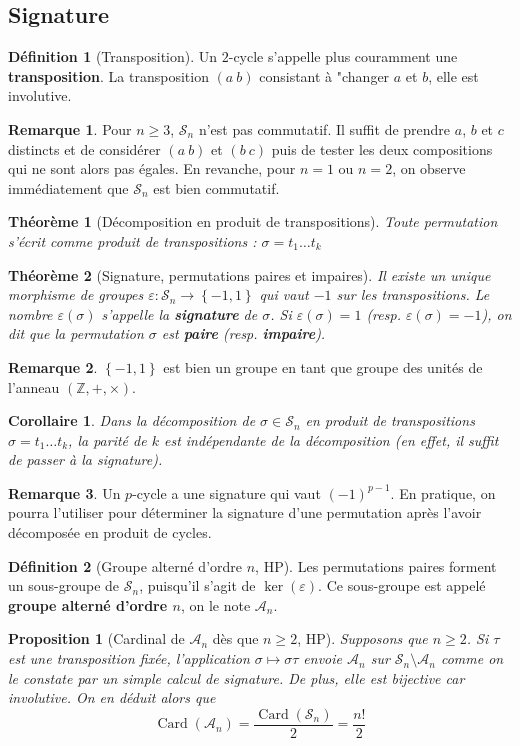 \documentclass[french]{book}
\newcommand{\Z}{\mathbb{Z}}
\theoremstyle{plain}
\newtheorem{thm}{Théorème}[chapter]
\newtheorem{prop}{Proposition}[chapter]
\newtheorem{cor}{Corollaire}[chapter]
\theoremstyle{definition}
\newtheorem{dfn}{Définition}[chapter]
\newtheorem{rmq}{Remarque}[chapter]
\theoremstyle{remark}
\DeclareMathOperator{\card}{Card}
\begin{document}
\subsection{Signature}
\begin{dfn}[Transposition]
	Un $2$-cycle s'appelle plus couramment une \textbf{transposition}. La transposition $(a\ b)$ consistant à "changer $a$ et $b$, elle est involutive.
\end{dfn}
\begin{rmq} Pour $n\geqslant 3$, $\mathcal{S}_n$ n'est pas commutatif. Il suffit de prendre $a$, $b$ et $c$ distincts et de considérer $(a\ b)$ et $(b\ c)$ puis de tester les deux compositions qui ne sont alors pas égales. En revanche, pour $n=1$ ou $n=2$, on observe immédiatement que $\mathcal{S}_n$ est bien commutatif. \end{rmq}
\begin{thm}[Décomposition en produit de transpositions]
	Toute permutation s'écrit comme produit de transpositions : $\sigma=t_1\ldots t_k$
\end{thm}
\begin{thm}[Signature, permutations paires et impaires]
	Il existe un unique morphisme de groupes $\varepsilon:\mathcal{S}_n\rightarrow\left\{-1,1\right\}$ qui vaut $-1$ sur les transpositions. Le nombre $\varepsilon(\sigma)$ s'appelle la \textbf{signature} de $\sigma$. Si $\varepsilon(\sigma)=1$ (resp. $\varepsilon(\sigma)=-1$), on dit que la permutation $\sigma$ est \textbf{paire} (resp. \textbf{impaire}).
\end{thm}
\begin{rmq} $\left\{-1,1\right\}$ est bien un groupe en tant que groupe des unités de l'anneau $(\Z,+,\times)$. \end{rmq}
\begin{cor}
	Dans la décomposition de $\sigma\in\mathcal{S}_n$ en produit de transpositions $\sigma=t_1\ldots t_k$, la parité de $k$ est indépendante de la décomposition (en effet, il suffit de passer à la signature).
\end{cor}
\begin{rmq} Un $p$-cycle a une signature qui vaut $(-1)^{p-1}$. En pratique, on pourra l'utiliser pour déterminer la signature d'une permutation après l'avoir décomposée en produit de cycles. \end{rmq}
\begin{dfn}[Groupe alterné d'ordre $n$, HP]
	Les permutations paires forment un sous-groupe de $\mathcal{S}_n$, puisqu'il s'agit de $\ker(\varepsilon)$. Ce sous-groupe est appelé \textbf{groupe alterné d'ordre $n$}, on le note $\mathcal{A}_n$.
\end{dfn}
\begin{prop}[Cardinal de $\mathcal{A}_n$ dès que $n\geqslant2$, HP]
	Supposons que $n\geqslant 2$. Si $\tau$ est une transposition fixée, l'application $\sigma\mapsto\sigma\tau$ envoie $\mathcal{A}_n$ sur $\mathcal{S}_n\setminus\mathcal{A}_n$ comme on le constate par un simple calcul de signature. De plus, elle est bijective car involutive. On en déduit alors que $$\card(\mathcal{A}_n)=\frac{\card(\mathcal{S}_n)}{2}=\frac{n!}{2}$$
\end{prop}
\end{document}
